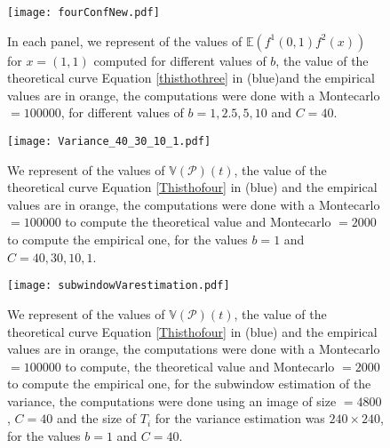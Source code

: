 \documentclass[12pt]{article}
\theoremstyle{Theorem}
\theoremstyle{definition}
\begin{document}
\begin{figure}[H]
  \centering
    {\texttt{[image: fourConfNew.pdf]}}
    \hspace{0.2cm}
 \caption{In each panel, we represent of the values of $\mathbb{E}\left(f^{1}(0,1)f^{2}(x)\right)$ for $x = (1, 1)$ computed for different values of $b$, the value of the theoretical curve Equation \eqref{thisthothree} in (blue)and the empirical values are in orange, the computations were done with a Montecarlo $= 100000$, for different values of $b = 1, 2.5, 5, 10$ and $C = 40$. }
\label{fig2}
\end{figure}

\begin{figure}[H]
  \centering
    {\texttt{[image: Variance\_40\_30\_10\_1.pdf]}}
    \hspace{0.2cm}
 \caption{We represent of the values of $\mathbb{V}\left(\mathcal{P}\right)(t)$, the value of the theoretical curve Equation \eqref{Thisthofour} in (blue) and the empirical values are in orange, the computations were done with a Montecarlo $= 100000$ to compute the theoretical value and Montecarlo $= 2000$ to compute the empirical one, for the values $b = 1$ and $C = 40, 30, 10,1$. }
\label{fig2}
\end{figure}
\begin{figure}[H]
  \centering
    {\texttt{[image: subwindowVarestimation.pdf]}}
    \hspace{0.2cm}
 \caption{We represent of the values of $\mathbb{V}\left(\mathcal{P}\right)(t)$, the value of the theoretical curve Equation \eqref{Thisthofour} in (blue) and the empirical values are in orange, the computations were done with a Montecarlo $= 100000$ to compute, the theoretical value and Montecarlo $= 2000$ to compute the empirical one, for the subwindow estimation of the variance, the computations were done using an image of size $= 4800$, $C = 40$ and the size of $T_{i}$ for the variance estimation was $240\times240$, for the values $b = 1$ and $C = 40$. }
\label{fig2}
\end{figure}
\appendix 
\end{document}
